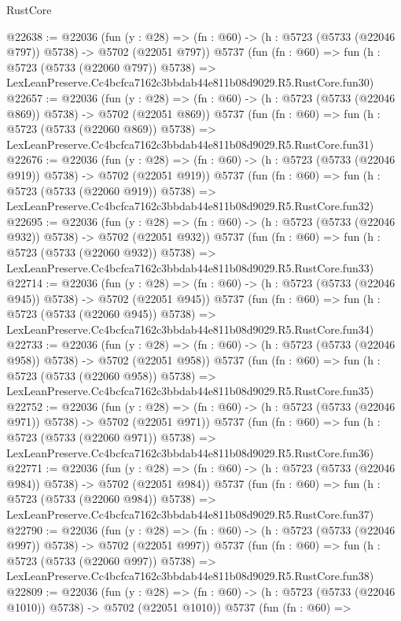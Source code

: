 \begin{lexlean}{RustCore}
\begin{coremodule}
@22638 := @22036
    (fun (y : @28) => (fn : @60) -> (h : @5723 (@5733 (@22046 @797)) @5738) -> @5702 (@22051 @797))
    @5737
    (fun (fn : @60) =>
    fun (h : @5723 (@5733 (@22060 @797)) @5738) =>
    LexLeanPreserve.Cc4bcfca7162c3bbdab44e811b08d9029.R5.RustCore.fun30)
@22657 := @22036
    (fun (y : @28) => (fn : @60) -> (h : @5723 (@5733 (@22046 @869)) @5738) -> @5702 (@22051 @869))
    @5737
    (fun (fn : @60) =>
    fun (h : @5723 (@5733 (@22060 @869)) @5738) =>
    LexLeanPreserve.Cc4bcfca7162c3bbdab44e811b08d9029.R5.RustCore.fun31)
@22676 := @22036
    (fun (y : @28) => (fn : @60) -> (h : @5723 (@5733 (@22046 @919)) @5738) -> @5702 (@22051 @919))
    @5737
    (fun (fn : @60) =>
    fun (h : @5723 (@5733 (@22060 @919)) @5738) =>
    LexLeanPreserve.Cc4bcfca7162c3bbdab44e811b08d9029.R5.RustCore.fun32)
@22695 := @22036
    (fun (y : @28) => (fn : @60) -> (h : @5723 (@5733 (@22046 @932)) @5738) -> @5702 (@22051 @932))
    @5737
    (fun (fn : @60) =>
    fun (h : @5723 (@5733 (@22060 @932)) @5738) =>
    LexLeanPreserve.Cc4bcfca7162c3bbdab44e811b08d9029.R5.RustCore.fun33)
@22714 := @22036
    (fun (y : @28) => (fn : @60) -> (h : @5723 (@5733 (@22046 @945)) @5738) -> @5702 (@22051 @945))
    @5737
    (fun (fn : @60) =>
    fun (h : @5723 (@5733 (@22060 @945)) @5738) =>
    LexLeanPreserve.Cc4bcfca7162c3bbdab44e811b08d9029.R5.RustCore.fun34)
@22733 := @22036
    (fun (y : @28) => (fn : @60) -> (h : @5723 (@5733 (@22046 @958)) @5738) -> @5702 (@22051 @958))
    @5737
    (fun (fn : @60) =>
    fun (h : @5723 (@5733 (@22060 @958)) @5738) =>
    LexLeanPreserve.Cc4bcfca7162c3bbdab44e811b08d9029.R5.RustCore.fun35)
@22752 := @22036
    (fun (y : @28) => (fn : @60) -> (h : @5723 (@5733 (@22046 @971)) @5738) -> @5702 (@22051 @971))
    @5737
    (fun (fn : @60) =>
    fun (h : @5723 (@5733 (@22060 @971)) @5738) =>
    LexLeanPreserve.Cc4bcfca7162c3bbdab44e811b08d9029.R5.RustCore.fun36)
@22771 := @22036
    (fun (y : @28) => (fn : @60) -> (h : @5723 (@5733 (@22046 @984)) @5738) -> @5702 (@22051 @984))
    @5737
    (fun (fn : @60) =>
    fun (h : @5723 (@5733 (@22060 @984)) @5738) =>
    LexLeanPreserve.Cc4bcfca7162c3bbdab44e811b08d9029.R5.RustCore.fun37)
@22790 := @22036
    (fun (y : @28) => (fn : @60) -> (h : @5723 (@5733 (@22046 @997)) @5738) -> @5702 (@22051 @997))
    @5737
    (fun (fn : @60) =>
    fun (h : @5723 (@5733 (@22060 @997)) @5738) =>
    LexLeanPreserve.Cc4bcfca7162c3bbdab44e811b08d9029.R5.RustCore.fun38)
@22809 := @22036
    (fun (y : @28) =>
    (fn : @60) -> (h : @5723 (@5733 (@22046 @1010)) @5738) -> @5702 (@22051 @1010))
    @5737
    (fun (fn : @60) =>

\end{coremodule}
\end{lexlean}
